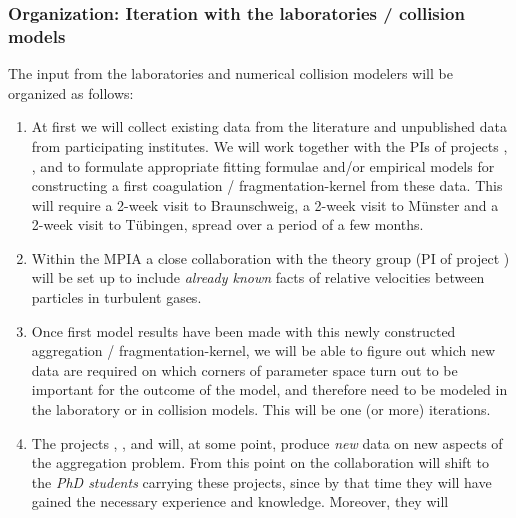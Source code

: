 %


\subsubsection{Organization: Iteration with the laboratories / collision models}
The input from the laboratories and numerical collision modelers will be
organized as follows:
\begin{enumerate}
\item At first we will collect existing data from the literature and
unpublished data from participating institutes. We will 
work together with the PIs of projects \projblum{},
\projwurm{}, \projblumtrie{} and \projkley{} to formulate appropriate
fitting formulae and/or empirical models for constructing a first
coagulation / fragmen\-tation-kernel from these data.
This will require a 2-week visit to Braunschweig, a 2-week visit to
M\"unster and a 2-week visit to T\"ubingen, spread over a period of a few
months.
\item Within the MPIA a close collaboration with the theory group (PI
of project \projklahr{}) will be set up to include {\em already known}
facts of relative velocities between particles in turbulent gases.
\item Once first model results have been made with this newly constructed
aggregation / fragmen\-tation-kernel, we will be able to figure out which new
data are required on which corners of parameter space turn out to be important
for the outcome of the model, and therefore need to be modeled in the
laboratory or in collision models.
This will be one (or more) iterations.
\item The projects \projblum{}, \projwurm{}, \projblumtrie{} and \projkley{}
will, at some point, produce {\em new} data on new aspects of the
aggregation problem. From this point on the collaboration will shift to
the {\em PhD students} carrying these projects, since by that time they
will have gained the necessary experience and knowledge. Moreover, they will

\end{enumerate}
